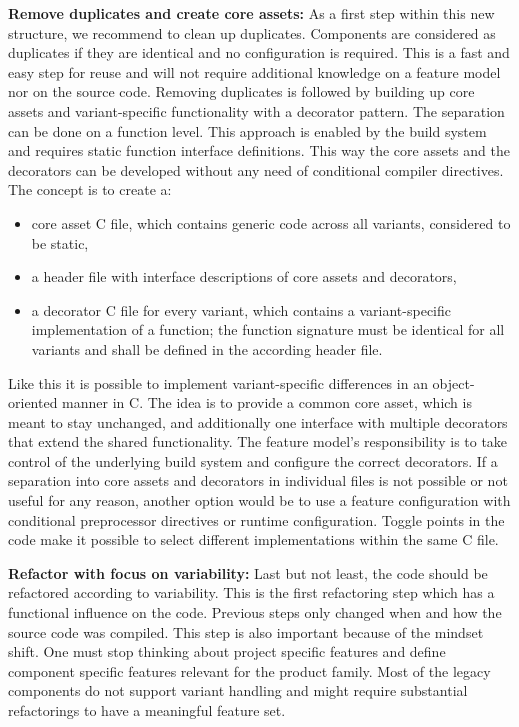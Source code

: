 \textbf{Remove duplicates and create core assets:} As a first step within this
new structure, we recommend to clean up duplicates. Components are considered as
duplicates if they are identical and no configuration is required. This is a
fast and easy step for reuse and will not require additional knowledge on a
feature model nor on the source code. Removing duplicates is followed by
building up core assets and variant-specific functionality with a decorator
pattern. The separation can be done on a function level. This approach is
enabled by the build system and requires static function interface definitions.
This way the core assets and the decorators can be developed without any need of
conditional compiler directives. The concept is to create a:
\begin{itemize}
  \item core asset C file, which contains generic code across all variants,
        considered to be static,
  \item a header file with interface descriptions of core assets and decorators,
  \item a decorator C file for every variant, which contains a variant-specific
        implementation of a function; the function signature must be identical
        for all variants and shall be defined in the according header file.
\end{itemize}
Like this it is possible to implement variant-specific differences in an
object-oriented manner in C. The idea is to provide a common core asset, which
is meant to stay unchanged, and additionally one interface with multiple
decorators that extend the shared functionality. The feature model's
responsibility is to take control of the underlying build system and configure
the correct decorators. If a separation into core assets and decorators in
individual files is not possible or not useful for any reason, another option
would be to use a feature configuration with conditional preprocessor directives
or runtime configuration. Toggle points in the code make it possible to select
different implementations within the same C file.

\textbf{Refactor with focus on variability:} Last but not least, the code should
be refactored according to variability. This is the first refactoring step which
has a functional influence on the code. Previous steps only changed when and how
the source code was compiled. This step is also important because of the mindset
shift. One must stop thinking about project specific features and define
component specific features relevant for the product family. Most of the legacy
components do not support variant handling and might require substantial
refactorings to have a meaningful feature set.

